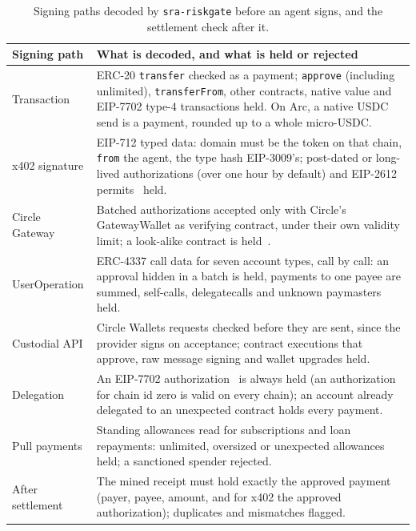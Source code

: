 \documentclass[11pt]{article}
\newcommand{\code}[1]{\texttt{#1}}
\begin{document}
\begin{table}[t]
\centering
\small
\begin{tabularx}{\linewidth}{@{}lX@{}}
\toprule
Signing path & What is decoded, and what is held or rejected \\
\midrule
Transaction & ERC-20 \code{transfer} checked as a payment; \code{approve} (including unlimited), \code{transferFrom}, other contracts, native value and EIP-7702 type-4 transactions held. On Arc, a native USDC send is a payment, rounded up to a whole micro-USDC. \\
x402 signature & EIP-712 typed data: domain must be the token on that chain, \code{from} the agent, the type hash EIP-3009's; post-dated or long-lived authorizations (over one hour by default) and EIP-2612 permits~\cite{eip2612} held. \\
Circle Gateway & Batched authorizations accepted only with Circle's GatewayWallet as verifying contract, under their own validity limit; a look-alike contract is held~\cite{gateway}. \\
UserOperation & ERC-4337 call data for seven account types, call by call: an approval hidden in a batch is held, payments to one payee are summed, self-calls, delegatecalls and unknown paymasters held. \\
Custodial API & Circle Wallets requests checked before they are sent, since the provider signs on acceptance; contract executions that approve, raw message signing and wallet upgrades held. \\
Delegation & An EIP-7702 authorization~\cite{eip7702} is always held (an authorization for chain id zero is valid on every chain); an account already delegated to an unexpected contract holds every payment. \\
Pull payments & Standing allowances read for subscriptions and loan repayments: unlimited, oversized or unexpected allowances held; a sanctioned spender rejected. \\
After settlement & The mined receipt must hold exactly the approved payment (payer, payee, amount, and for x402 the approved authorization); duplicates and mismatches flagged. \\
\bottomrule
\end{tabularx}
\caption{Signing paths decoded by \code{sra-riskgate} before an agent signs, and the settlement check after it.}
\label{tab:paths}
\end{table}
\end{document}
